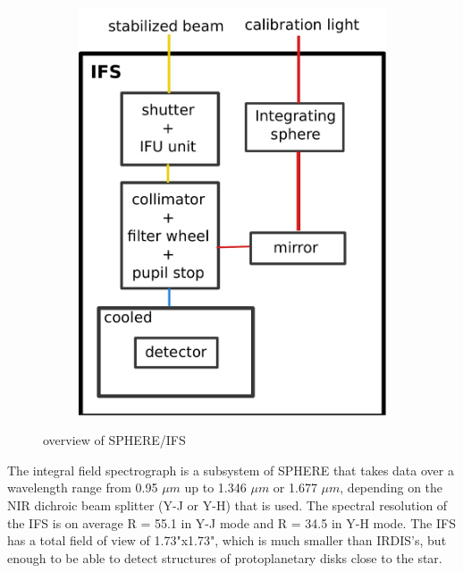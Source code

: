 \documentclass[twoside,single,12pt]{lion-msc}
\begin{document}
\begin{figure}[hb]
\begin{subfigure}{.30\textwidth}
  \includegraphics[trim={0cm 0cm 0cm 0cm},clip,width=1\linewidth]{overview}
  \caption{}
\end{subfigure}
\caption{overview of SPHERE/IFS}
\label{fig:overviewIFS}
\end{figure}

The integral field spectrograph is a subsystem of SPHERE that takes data over a wavelength range from 0.95 $\mu m$ up to 1.346 $\mu m$ or 1.677 $\mu m$,  depending on the NIR dichroic beam splitter (Y-J or Y-H) that is used. The spectral resolution of the IFS is on average R = 55.1 in Y-J mode and R = 34.5 in Y-H mode. The IFS has a total field of view of 1.73"x1.73", which is much smaller than IRDIS's, but enough to be able to detect structures of protoplanetary disks close to the star.
\clearpage 
\end{document}
